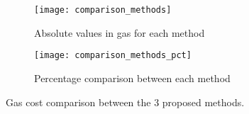 \begin{figure}[ht!]
    \centering
    \begin{subfigure}[c]{0.7\textwidth}
        \centering
        \texttt{[image: comparison\_methods]}
        \caption{Absolute values in gas for each method}
        \label{fig:gascomp:absolute}
    \end{subfigure}

    \begin{subfigure}[c]{0.7\textwidth}
        \centering
        \texttt{[image: comparison\_methods\_pct]}
        \caption{Percentage comparison between each method}
        \label{fig:gascomp:pct}
    \end{subfigure}

    \caption{Gas cost comparison between the 3 proposed methods.}
    \label{fig:gascomp}
\end{figure}